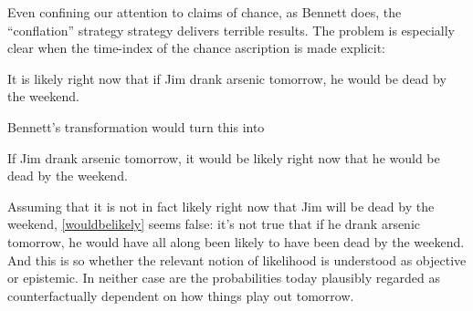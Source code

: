 \documentclass[leqno, 11pt, a5paper, openany]{article}
\begin{document}
Even confining our attention to claims of chance, as Bennett does, the “conflation” strategy strategy delivers terrible results. The problem is especially clear when the time-index of the chance ascription is made explicit:
\begin{prop}
	\nitem \label{nowlikely}
	It is likely right now that if Jim drank arsenic tomorrow, he would be dead by the weekend.
\end{prop}
Bennett's transformation would turn this into
\begin{prop}
	\nitem \label{wouldbelikely}
	If Jim drank arsenic tomorrow, it would be likely right now that he would be dead by the weekend.
\end{prop}
Assuming that it is not in fact likely right now that Jim will be dead by the weekend, \ref{wouldbelikely} seems false: it's not true that if he drank arsenic tomorrow, he would have all along been likely to have been dead by the weekend. And this is so whether the relevant notion of likelihood is understood as objective or epistemic.  In neither case are the probabilities today plausibly regarded as counterfactually dependent on how things play out tomorrow.
\end{document}
